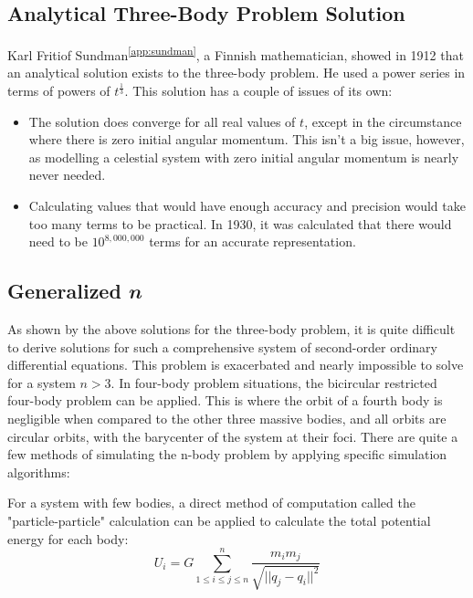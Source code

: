 \documentclass[12pt]{article}
\newcommand{\sref}[1]{\textsuperscript{\ref{#1}}}
\begin{document}
\begin{spacing}{1.25}
\subsection{Analytical Three-Body Problem Solution}
\par {
    Karl Fritiof Sundman\sref{app:sundman}, a Finnish mathematician, showed in 1912 that an analytical solution exists to the three-body problem. He used a power series in terms of powers of \(t^{\frac{1}{3}}\). This solution has a couple of issues of its own:
    \begin{itemize}
        \item The solution does converge for all real values of \(t\), except in the circumstance where there is zero initial angular momentum. This isn't a big issue, however, as modelling a celestial system with zero initial angular momentum is nearly never needed.
        \item Calculating values that would have enough accuracy and precision would take too many terms to be practical. In 1930, it was calculated that there would need to be \(10^{8,000,000}\) terms for an accurate representation.
    \end{itemize}
}


\subsection{Generalized \(\mathbfit{n}\)}
\par {
    As shown by the above solutions for the three-body problem, it is quite difficult to derive solutions for such a comprehensive system of second-order ordinary differential equations. This problem is exacerbated and nearly impossible to solve for a system \(n > 3\). In four-body problem situations, the bicircular restricted four-body problem can be applied. This is where the orbit of a fourth body is negligible when compared to the other three massive bodies, and all orbits are circular orbits, with the barycenter of the system at their foci. There are quite a few methods of simulating the n-body problem by applying specific simulation algorithms:
}

\par {
    For a system with few bodies, a direct method of computation called the "particle-particle" calculation can be applied to calculate the total potential energy for each body:
    \begin{equation*}
        U_i = G \sum_{1 \leq i \leq j \leq n}^{n}{ \frac{m_im_j}{\sqrt{|| q_j - q_i ||^2}} }
    \end{equation*}

}
\end{spacing}
\end{document}
